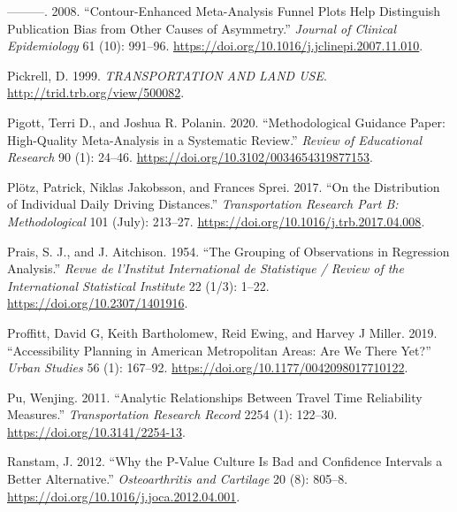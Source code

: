 \documentclass[
  11pt,
  openany]{memoir}
\newlength{\cslhangindent}
\newlength{\cslentryspacingunit} %
\newenvironment{CSLReferences}[2] %
 {%
  \setlength{\parindent}{0pt}
  \ifodd #1
  \let\oldpar\par
  \def\par{\hangindent=\cslhangindent\oldpar}
  \fi
  \setlength{\parskip}{#2\cslentryspacingunit}
 }%
 {}
\begin{document}
\begin{CSLReferences}{1}{0}
\leavevmode{}%
---------. 2008. {``Contour-Enhanced Meta-Analysis Funnel Plots Help Distinguish Publication Bias from Other Causes of Asymmetry.''} \emph{Journal of Clinical Epidemiology} 61 (10): 991--96. \url{https://doi.org/10.1016/j.jclinepi.2007.11.010}.

\leavevmode{}%
Pickrell, D. 1999. \emph{{TRANSPORTATION AND LAND USE}}. \url{http://trid.trb.org/view/500082}.

\leavevmode{}%
Pigott, Terri D., and Joshua R. Polanin. 2020. {``Methodological {Guidance Paper}: High-{Quality Meta}-{Analysis} in a {Systematic Review}.''} \emph{Review of Educational Research} 90 (1): 24--46. \url{https://doi.org/10.3102/0034654319877153}.

\leavevmode{}%
Plötz, Patrick, Niklas Jakobsson, and Frances Sprei. 2017. {``On the Distribution of Individual Daily Driving Distances.''} \emph{Transportation Research Part B: Methodological} 101 (July): 213--27. \url{https://doi.org/10.1016/j.trb.2017.04.008}.

\leavevmode{}%
Prais, S. J., and J. Aitchison. 1954. {``The {Grouping} of {Observations} in {Regression Analysis}.''} \emph{Revue de l'Institut International de Statistique / Review of the International Statistical Institute} 22 (1/3): 1--22. \url{https://doi.org/10.2307/1401916}.

\leavevmode{}%
Proffitt, David G, Keith Bartholomew, Reid Ewing, and Harvey J Miller. 2019. {``Accessibility Planning in {American} Metropolitan Areas: Are We There Yet?''} \emph{Urban Studies} 56 (1): 167--92. \url{https://doi.org/10.1177/0042098017710122}.

\leavevmode{}%
Pu, Wenjing. 2011. {``Analytic {Relationships} Between {Travel Time Reliability Measures}.''} \emph{Transportation Research Record} 2254 (1): 122--30. \url{https://doi.org/10.3141/2254-13}.

\leavevmode{}%
Ranstam, J. 2012. {``Why the {P}-Value Culture Is Bad and Confidence Intervals a Better Alternative.''} \emph{Osteoarthritis and Cartilage} 20 (8): 805--8. \url{https://doi.org/10.1016/j.joca.2012.04.001}.


\end{CSLReferences}
\end{document}

